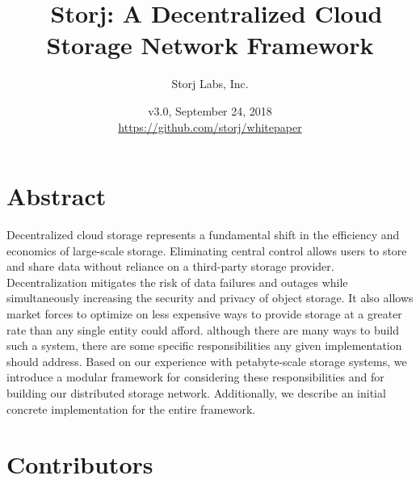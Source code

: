 \documentclass[11pt,fleqn,openany]{book}
\title{\textbf{\sffamily\color{white} \
Storj: A Decentralized Cloud Storage Network Framework}}
\author{\small\sffamily\color{white}
Storj Labs, Inc.}
\date{\small\sffamily\color{white} v3.0, September 24, 2018\\
\small\color{white}\url{https://github.com/storj/whitepaper}
}
\begin{document}
\thispagestyle{fancy}

\maketitle


\newpage

\tableofcontents\newpage

\section{Abstract}

Decentralized cloud storage represents a fundamental shift in
the efficiency and economics of large-scale storage.
Eliminating central control allows users to store and share data
without reliance on a third-party storage provider. Decentralization mitigates
the risk of data failures and outages while simultaneously increasing
the security and privacy of object storage. It also
allows market forces to optimize on less expensive ways to
provide storage at a greater rate than any single entity could afford.
although there are many ways to build such a system, there are some specific
responsibilities any given implementation should address.
Based on our experience with petabyte-scale
storage systems, we introduce a modular framework for considering these
responsibilities and for building our distributed storage network.
Additionally, we describe an initial
concrete implementation for the entire framework.

\section{Contributors}
\end{document}
